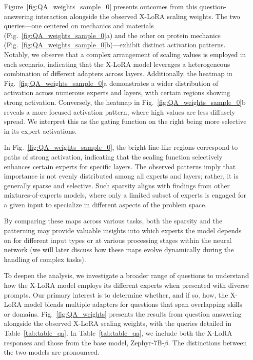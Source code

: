 Figure~\ref{fig:QA_weights_sample_0} presents outcomes from this question-answering interaction alongside the observed X-LoRA scaling weights. The two queries—one centered on mechanics and materials (Fig.~\ref{fig:QA_weights_sample_0}a) and the other on protein mechanics (Fig.~\ref{fig:QA_weights_sample_0}b)—exhibit distinct activation patterns. Notably, we observe that a complex arrangement of scaling values is employed in each scenario, indicating that the X-LoRA model leverages a heterogeneous combination of different adapters across layers. Additionally, the heatmap in Fig.~\ref{fig:QA_weights_sample_0}a demonstrates a wider distribution of activation across numerous experts and layers, with certain regions showing strong activation. Conversely, the heatmap in Fig.~\ref{fig:QA_weights_sample_0}b reveals a more focused activation pattern, where high values are less diffusely spread. We interpret this as the gating function on the right being more selective in its expert activations.

In Fig.~\ref{fig:QA_weights_sample_0}, the bright line-like regions correspond to paths of strong activation, indicating that the scaling function selectively enhances certain experts for specific layers. The observed patterns imply that importance is not evenly distributed among all experts and layers; rather, it is generally sparse and selective. Such sparsity aligns with findings from other mixtures-of-experts models, where only a limited subset of experts is engaged for a given input to specialize in different aspects of the problem space.

By comparing these maps across various tasks, both the sparsity and the patterning may provide valuable insights into which experts the model depends on for different input types or at various processing stages within the neural network (we will later discuss how these maps evolve dynamically during the handling of complex tasks).

To deepen the analysis, we investigate a broader range of questions to understand how the X-LoRA model employs its different experts when presented with diverse prompts. Our primary interest is to determine whether, and if so, how, the X-LoRA model blends multiple adapters for questions that span overlapping skills or domains. Fig.~\ref{fig:QA_weights} presents the results from question answering alongside the observed X-LoRA scaling weights, with the queries detailed in Table~\ref{tab:table_qa}. In Table~\ref{tab:table_qa}, we include both the X-LoRA responses and those from the base model, Zephyr-7B-$\beta$. The distinctions between the two models are pronounced.

